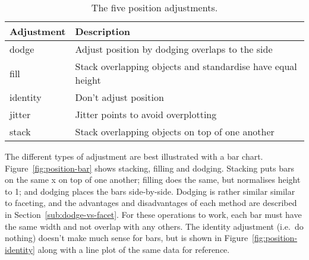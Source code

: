 \begin{table}
  \begin{center}
  \begin{tabular}{ll}
    \toprule
    Adjustment & Description  \\
    \midrule
    dodge     & Adjust position by dodging overlaps to the side \\
    fill      & Stack overlapping objects and standardise have equal height\\
    identity  & Don't adjust position \\
    jitter    & Jitter points to avoid overplotting \\
    stack     & Stack overlapping objects on top of one another \\
    \bottomrule
  \end{tabular}
  \end{center}
  \caption{The five position adjustments.}
  \label{fig:position}
\end{table}

The different types of adjustment are best illustrated with a bar chart.  Figure~\ref{fig:position-bar} shows stacking, filling and dodging.  Stacking puts bars on the same x on top of one another; filling does the same, but normalises height to 1; and dodging places the bars side-by-side.  Dodging is rather similar similar to faceting, and the advantages and disadvantages of each method are described in Section~\ref{sub:dodge-vs-facet}. For these operations to work, each bar must have the same width and not overlap with any others.  The identity adjustment (i.e.\ do nothing) doesn't make much sense for bars, but is shown in Figure~\ref{fig:position-identity} along with a line plot of the same data for reference.

% 


% 


